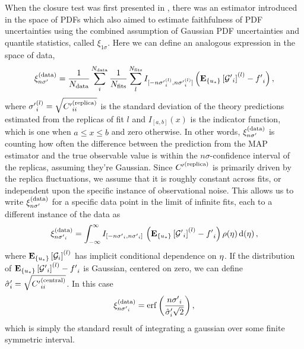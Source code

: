 When the closure test was first presented in \cite{nnpdf30}, there was an
estimator introduced in the space of PDFs which also aimed to estimate
faithfulness of PDF uncertainties using the combined assumption of Gaussian PDF
uncertainties and quantile statistics, called $\xi_{1\sigma}$. Here we can
define an analogous expression in the space of data,
\begin{equation}
    \label{eq:XiDataDef}
    \xi^{(\rm data)}_{n {{\sigma}^{\prime}}} = 
        \frac{1}{N_{\rm data}} \sum_{i}^{N_{\rm data}} 
        \frac{1}{N_{\rm fits}} \sum_{l}^{N_{\rm fits}}
            I_{[-n {{\sigma}^{\prime}}_i^{(l)}, n {{\sigma}^{\prime}}_i^{(l)}]}
            \left( \mathbf{E}_{\{ u_* \}} \left[ {{\mathcal{G}}^{\prime}}_i \right]^{(l)} - {{f}^{\prime}}_i \right),
\end{equation}
where ${{\sigma}^{\prime}}_i^{(l)} = \sqrt{{{C}^{\prime}}^{(\rm replica)}_{ii}}$ is the standard deviation
of the theory predictions estimated from the replicas of fit $l$ and $I_{[a,
b]}(x)$ is the indicator function, which is one when $a \leq x \leq b$ and zero
otherwise. In other words, $\xi^{(\rm data)}_{n {{\sigma}^{\prime}}}$ is counting how often the difference
between the prediction from the MAP estimator and the true observable value is
within the $n\sigma$-confidence interval of the replicas, assuming they're
Gaussian. Since ${{C}^{\prime}}^{(\rm replica)}$ is primarily driven by the replica fluctuations, we
assume that it is roughly constant across fits, or independent upon the specific
instance of observational noise. This allows us to write $\xi^{(\rm data)}_{n {{\sigma}^{\prime}}}$ for a
specific data point in the limit of infinite fits, each to a different instance
of the data as
%
\begin{equation}
    \label{eq:XiIExpecVel}
        \xi^{(\rm data)}_{n {{{\sigma}^{\prime}}_i}} =
            \int_{-\infty}^{\infty} I_{[-n {{\sigma}^{\prime}}_i, n {{\sigma}^{\prime}}_i]}\,
            \left( \mathbf{E}_{\{ u_* \}} \left[ {{\mathcal{G}}^{\prime}}_i \right]^{(l)} - {{f}^{\prime}}_i \right) 
            \rho(\eta) \, 
            {\rm d}(\eta) \, ,
\end{equation}
%
where $\mathbf{E}_{\{ u_* \}} \left[ \mathcal{G}_i \right]^{(l)}$ has implicit conditional dependence on
$\eta$. If the distribution of \linebreak
$\mathbf{E}_{\{ u_* \}} \left[ {{\mathcal{G}}^{\prime}}_i \right]^{(l)} - {{f}^{\prime}}_i$ is Gaussian, centered
on zero, we can define ${{{ \hat{\sigma} }^{\prime}}}_i = \sqrt{{{C}^{\prime}}^{(\rm central)}_{ii}}$. In
this case
\begin{equation}
    \label{eq:expectedxi}
    \xi^{(\rm data)}_{n {{{\sigma}^{\prime}}_i}} =
    {\rm erf} \left( \frac{n {{\sigma}^{\prime}}_i}{{{\hat{\sigma}}^{\prime}}_i \sqrt{2}}\right),
\end{equation}
which is simply the standard result of integrating a gaussian over some finite
symmetric interval.

